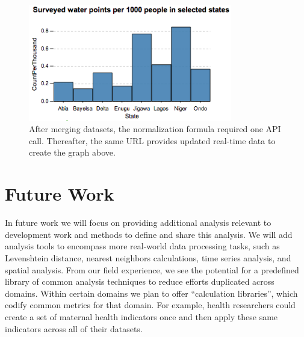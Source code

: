 \documentclass{sig-alternate}
\begin{document}
\begin{figure}
\centering
\includegraphics[width=3.5in]{figures/summary.png}
\caption{After merging datasets, the normalization formula required one API
    call. Thereafter, the same URL provides updated real-time data to create the graph above.}
\label{fig:summary}
\end{figure}


%
%

\section{Future Work}
In future work we will focus on providing additional analysis relevant to
development work and methods to define and share this analysis.
We will add analysis tools to encompass more
real-world data processing tasks, such as Levenshtein distance, nearest
neighbors calculations, time series analysis, and spatial analysis.
From our field experience, we see the potential for a predefined library of common analysis techniques to reduce
efforts duplicated across domains.
Within certain domains we plan to offer ``calculation libraries'',
which codify common metrics for that domain.  For example, health researchers could
create a set of maternal health indicators once and then apply these same
indicators across all of their datasets.
\end{document}
